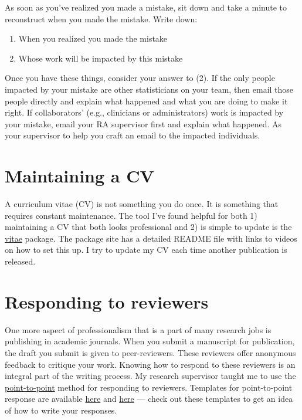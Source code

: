 \documentclass[
]{book}
\providecommand{\tightlist}{%
  \setlength{\itemsep}{0pt}\setlength{\parskip}{0pt}}
\begin{document}
As soon as you've realized you made a mistake, sit down and take a minute to reconstruct when you made the mistake. Write down:

\begin{enumerate}
\def\labelenumi{\arabic{enumi}.}
\tightlist
\item
  When you realized you made the mistake
\item
  Whose work will be impacted by this mistake
\end{enumerate}

Once you have these things, consider your answer to (2). If the only people impacted by your mistake are other statisticians on your team, then email those people directly and explain what happened and what you are doing to make it right. If collaborators' (e.g., clinicians or administrators) work is impacted by your mistake, email your RA supervisor first and explain what happened. As your supervisor to help you craft an email to the impacted individuals.

\hypertarget{maintaining-a-cv}{%
\section{Maintaining a CV}\label{maintaining-a-cv}}

A curriculum vitae (CV) is not something you do once. It is something that requires constant maintenance. The tool I've found helpful for both 1) maintaining a CV that both looks professional and 2) is simple to update is the \href{https://pkg.mitchelloharawild.com/vitae/}{vitae} package. The package site has a detailed README file with links to videos on how to set this up. I try to update my CV each time another publication is released.

\hypertarget{point-to-point}{%
\section{Responding to reviewers}\label{point-to-point}}

One more aspect of professionalism that is a part of many research jobs is publishing in academic journals. When you submit a manuscript for publication, the draft you submit is given to peer-reviewers. These reviewers offer anonymous feedback to critique your work. Knowing how to respond to these reviewers is an integral part of the writing process. My research supervisor taught me to use the \href{https://www.nature.com/documents/Effective_Response_To_Reviewers-1.pdf}{point-to-point} method for responding to reviewers. Templates for point-to-point response are available \href{https://onlinelibrary.wiley.com/pb-assets/assets/13989995/Point-by-point\%20response-24-January\%202019_CA\%20approved-1549540165760.docx}{here} and \href{https://apastyle.apa.org/style-grammar-guidelines/research-publication/sample-response-reviewers.pdf}{here} --- check out these templates to get an idea of how to write your responses.
\end{document}
